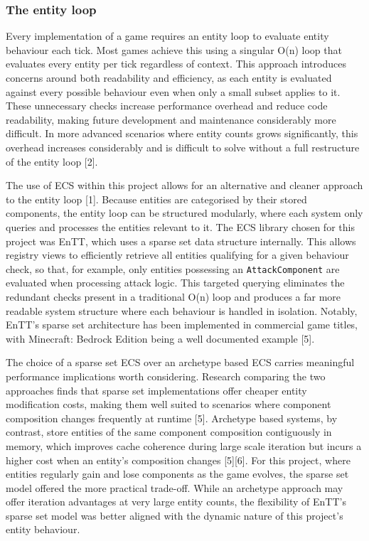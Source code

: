 \documentclass[]{final_report}
\begin{document}
\subsubsection{The entity loop}
Every implementation of a game requires an entity loop to evaluate entity 
behaviour each tick. Most games achieve this using a singular O(n) loop that 
evaluates every entity per tick regardless of context. This approach introduces 
concerns around both readability and efficiency, as each entity is evaluated 
against every possible behaviour even when only a small subset applies to it. 
These unnecessary checks increase performance overhead and reduce code 
readability, making future development and maintenance considerably more difficult. 
In more advanced scenarios where entity counts grows significantly, this overhead 
increases considerably and is difficult to solve without a full restructure of the entity loop [2].

The use of ECS within this project allows for an alternative and cleaner 
approach to the entity loop [1]. Because entities are categorised by 
their stored components, the entity loop can be structured modularly, where each system only queries and processes the entities relevant to 
it. The ECS library chosen for this project was EnTT, which uses a sparse set 
data structure internally. This allows registry views to efficiently retrieve all 
entities qualifying for a given behaviour check, so that, for example, only 
entities possessing an \texttt{AttackComponent} are evaluated when processing 
attack logic. This targeted querying eliminates the redundant checks present in 
a traditional O(n) loop and produces a far more readable system structure where 
each behaviour is handled in isolation. Notably, EnTT's sparse set architecture 
has been implemented in commercial game titles, with Minecraft: Bedrock Edition 
being a well documented example [5].

The choice of a sparse set ECS over an archetype based ECS carries meaningful 
performance implications worth considering. Research comparing the two 
approaches finds that sparse set implementations offer cheaper entity 
modification costs, making them well suited to scenarios where component 
composition changes frequently at runtime [5]. Archetype based systems, 
by contrast, store entities of the same component composition contiguously in 
memory, which improves cache coherence during large scale iteration but incurs 
a higher cost when an entity's composition changes [5][6]. For this 
project, where entities regularly gain and lose components as the game evolves, 
the sparse set model offered the more practical trade-off. While an archetype 
approach may offer iteration advantages at very large entity counts, 
the flexibility of EnTT's sparse set model was better aligned with the dynamic 
nature of this project's entity behaviour.
\end{document}
